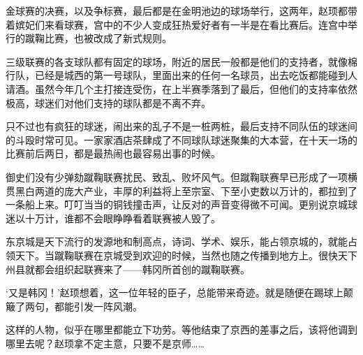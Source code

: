 金球赛的决赛，以及争标赛，最后都是在金明池边的球场举行，这两年，赵顼都带着嫔妃们来看球赛，宫中的不少人变成狂热爱好者有一半是在看比赛后。连宫中举行的蹴鞠比赛，也被改成了新式规则。

三级联赛的各支球队都有固定的球场，附近的居民一般都是他们的支持者，就像棉行队，已经是城西的第一号球队，里面出来的任何一名球员，出去吃饭都能碰到人请酒。虽然今年几个主打接连受伤，在上半赛季落到了最后，但他们的支持率依然极高，球迷们对他们支持的球队都是不离不弃。

只不过也有疯狂的球迷，闹出来的乱子不是一桩两桩，最后支持不同队伍的球迷间的斗殴时常可见。一家家酒店茶肆成了不同球队球迷聚集的大本营，在十天一场的比赛前后两日，都是最热闹也最容易出事的时候。

御史们没有少弹劾蹴鞠联赛扰民、致乱、败坏风气。但蹴鞠联赛早已形成了一项横贯黑白两道的庞大产业，丰厚的利益将上至宗室、下至小吏数以万计的，都拉到了一条船上来。叮叮当当的铜钱撞击声，让反对的声音变得微不可闻。更别说京城球迷以十万计，谁都不会眼睁睁看着联赛被人毁了。

东京城是天下流行的发源地和制高点，诗词、学术、娱乐，能占领京城的，就能占领天下。当蹴鞠联赛在京城受到欢迎的时候，当然也随之传播到地方上。很快天下州县就都会组织起联赛来了——韩冈所首创的蹴鞠联赛。

‘又是韩冈！’赵顼想着，这一位年轻的臣子，总能带来奇迹。就是随便在踢球上颠簸了两句，都能引发一阵风潮。

这样的人物，似乎在哪里都能立下功劳。等他结束了京西的差事之后，该将他调到哪里去呢？赵顼拿不定主意，只要不是京师……

